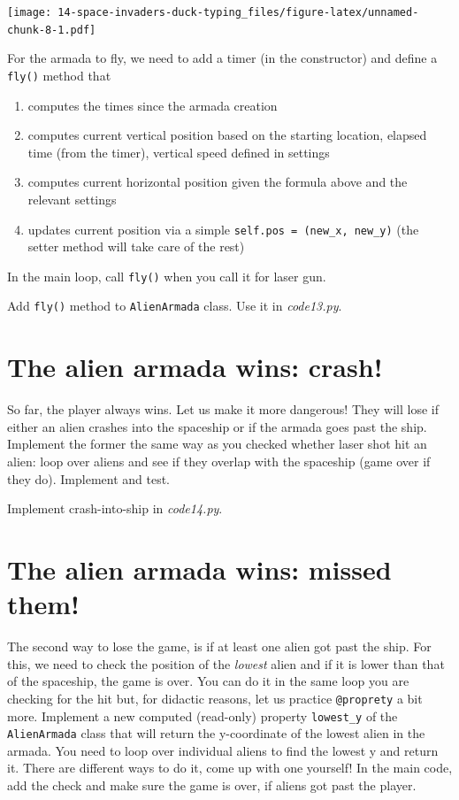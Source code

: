 \documentclass[
]{book}
\providecommand{\tightlist}{%
  \setlength{\itemsep}{0pt}\setlength{\parskip}{0pt}}
\begin{document}
\texttt{[image: 14-space-invaders-duck-typing\_files/figure-latex/unnamed-chunk-8-1.pdf]}

For the armada to fly, we need to add a timer (in the constructor) and define a \texttt{fly()} method that

\begin{enumerate}
\def\labelenumi{\arabic{enumi}.}
\tightlist
\item
  computes the times since the armada creation
\item
  computes current vertical position based on the starting location, elapsed time (from the timer), vertical speed defined in settings
\item
  computes current horizontal position given the formula above and the relevant settings
\item
  updates current position via a simple \texttt{self.pos\ =\ (new\_x,\ new\_y)} (the setter method will take care of the rest)
\end{enumerate}

In the main loop, call \texttt{fly()} when you call it for laser gun.

Add \texttt{fly()} method to \texttt{AlienArmada} class.
Use it in \emph{code13.py}.

\hypertarget{the-alien-armada-wins-crash}{%
\section{The alien armada wins: crash!}\label{the-alien-armada-wins-crash}}

So far, the player always wins. Let us make it more dangerous! They will lose if either an alien crashes into the spaceship or if the armada goes past the ship. Implement the former the same way as you checked whether laser shot hit an alien: loop over aliens and see if they overlap with the spaceship (game over if they do). Implement and test.

Implement crash-into-ship in \emph{code14.py}.

\hypertarget{the-alien-armada-wins-missed-them}{%
\section{The alien armada wins: missed them!}\label{the-alien-armada-wins-missed-them}}

The second way to lose the game, is if at least one alien got past the ship. For this, we need to check the position of the \emph{lowest} alien and if it is lower than that of the spaceship, the game is over. You can do it in the same loop you are checking for the hit but, for didactic reasons, let us practice \texttt{@proprety} a bit more. Implement a new computed (read-only) property \texttt{lowest\_y} of the \texttt{AlienArmada} class that will return the y-coordinate of the lowest alien in the armada. You need to loop over individual aliens to find the lowest y and return it. There are different ways to do it, come up with one yourself! In the main code, add the check and make sure the game is over, if aliens got past the player.
\end{document}
